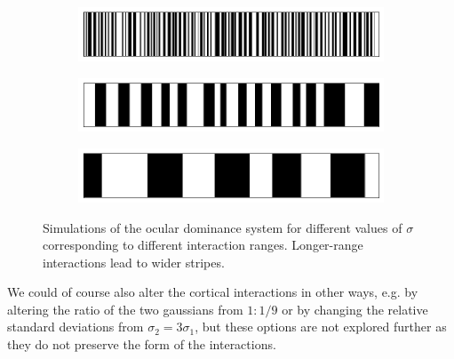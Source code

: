 \documentclass{article}
\begin{document}
\begin{figure}[h]
	\centering
	\begin{subfigure}[t]{0.60\linewidth}
		\centering
		\includegraphics[width = 1.0\linewidth, trim={0 0 0 0}, clip=true]{figures/occsim_012_heat.png}
	\end{subfigure}%
	\hspace{0.03\linewidth}
	\begin{subfigure}[t]{0.60\linewidth}
		\centering
		\includegraphics[width = 1.0\linewidth, trim={0 0 0 0}, clip=true]{figures/occsim_066_heat.png}
	\end{subfigure}%
	\hspace{0.03\linewidth}
	\begin{subfigure}[t]{0.60\linewidth}
		\centering
		\includegraphics[width = 1.0\linewidth, trim={0 0 0 0}, clip=true]{figures/occsim_174_heat.png}
	\end{subfigure}%
\caption{Simulations of the ocular dominance system for different values of $\sigma$ corresponding to different interaction ranges. Longer-range interactions lead to wider stripes.}
\label{fig:sigs}
\end{figure}

We could of course also alter the cortical interactions in other ways, e.g. by altering the ratio of the two gaussians from $1 : 1/9$ or by changing the relative standard deviations from $\sigma_2 = 3 \sigma_1$, but these options are not explored further as they do not preserve the form of the interactions.
\end{document}
